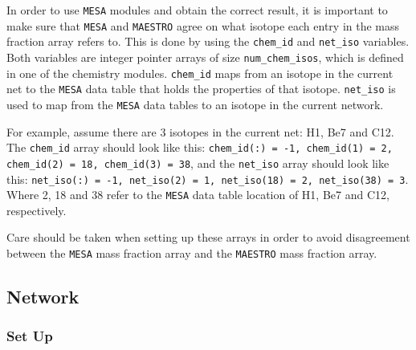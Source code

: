 In order to use {\tt MESA} modules and obtain the correct result, it is 
important to make sure that {\tt MESA} and {\tt MAESTRO} agree on what 
isotope each entry in the mass fraction array refers to. This is done by 
using the {\tt chem\_id} and {\tt net\_iso} variables. Both variables are 
integer pointer arrays of size {\tt num\_chem\_isos}, which is defined in one 
of the chemistry modules. {\tt chem\_id} maps from an isotope in the current 
net to the {\tt MESA} data table that holds the properties of that isotope. 
{\tt net\_iso} is used to map from the {\tt MESA} data tables to an isotope 
in the current network. 

For example, assume there are 3 isotopes in the current net: H1, Be7 and C12. 
The {\tt chem\_id} array should look like this: {\tt chem\_id(:) = -1, 
chem\_id(1) = 2, chem\_id(2) = 18, chem\_id(3) = 38}, and the 
{\tt net\_iso} array should look like this: {\tt net\_iso(:) = -1, 
net\_iso(2) = 1, net\_iso(18) = 2, net\_iso(38) = 3}. Where 2, 18 and 38 
refer to the {\tt MESA} data table location of H1, Be7 and C12, respectively.

Care should be taken when setting up these arrays in order to avoid 
disagreement between the {\tt MESA} mass fraction array and the {\tt MAESTRO} 
mass fraction array. 

\subsection{Network}

\subsubsection{Set Up}

